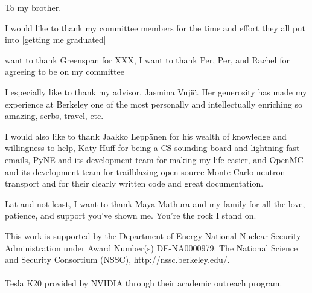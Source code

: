 \documentclass{ucbthesis}
\begin{document}
\begin{frontmatter}

\begin{dedication}
\null\vfil
\begin{center}
To my brother. \\\vspace{12pt}

\end{center}
\vfil\null
\end{dedication}

\tableofcontents
\clearpage
\listoffigures
\clearpage
\listoftables

\begin{acknowledgements}

 I would like to thank my committee members for the time and effort they all put into [getting me graduated]
 
 want to thank Greenspan for XXX,  I want to thank Per, Per, and Rachel for agreeing to be on my committee  
  
 I especially like to thank my advisor, Jasmina Vuji{\"c}.  Her generosity has made my experience at Berkeley one of the most personally and intellectually enriching 
 	 so amazing, serbs, travel, etc.

I would also like to thank Jaakko Lepp{\"a}nen for his wealth of knowledge and willingness to help, Katy Huff for being a CS sounding board and lightning fast emails, PyNE and its development team for making my life easier, and OpenMC and its development team for trailblazing open source Monte Carlo neutron transport and for their clearly written code and great documentation.	  

Lat and not least, I want to thank Maya Mathura and my family for all the love, patience, and support you've shown me.  You're the rock I stand on.  

\vfill
\noindent This work is supported by the Department of Energy National Nuclear Security Administration under Award Number(s) DE-NA0000979: The National Science and Security Consortium (NSSC), http://nssc.berkeley.edu/.
\\ \\
\noindent Tesla K20 provided by NVIDIA through their academic outreach program.

\end{acknowledgements}

\end{frontmatter}

\pagestyle{headings}

\let\originaleqref\eqref
\renewcommand{\eqref}{Eq.~\originaleqref}






\begin{appendix}


\end{appendix}

\printbibliography
\end{document}
